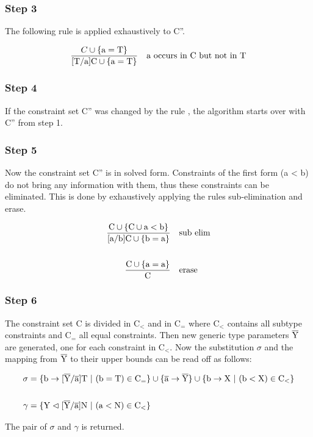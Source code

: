 \subsubsection{Step 3}
The following rule is applied exhaustively to C''.

\begin{align*}
    \frac{C \cup \{ \text{a} = \text{T} \}}{ \text{[T/a]C} \cup \{ \text{a} = \text{T} \} } \quad \text{a occurs in C but not in T}
\end{align*}

\subsubsection{Step 4}
If the constraint set C'' was changed by the rule , the algorithm starts over with C'' from step 1.

\subsubsection{Step 5}
Now the constraint set C'' is in solved form. Constraints of the first form (a < b) do not bring any information with them, thus these constraints can be eliminated.
This is done by exhaustively applying the rules sub-elimination and erase.

\begin{align*}
    \frac{\text{C} \cup \{ \text{C} \cup \text{a} < \text{b} \}}{ \text{[a/b]C} \cup \{ \text{b} = \text{a} \} } \quad &\text{sub elim}
    \\
    \\
    \frac{\text{C} \cup \{ \text{a} = \text{a} \} }{ \text{C} } \quad &\text{erase}
\end{align*}

\subsubsection{Step 6}
The constraint set C is divided in $\text{C}_<$ and in $\text{C}_=$ where $\text{C}_<$ contains all subtype constraints and $\text{C}_=$ all equal constraints.
Then new generic type parameters $\overline{\text{Y}}$ are generated, one for each constraint in $\text{C}_<$. Now the substitution $\sigma$ and the mapping from $\overline{\text{Y}}$ to their upper bounds can be read off as follows:

\begin{align*}
    \sigma &= \{ \text{b} \to \tsxsn{Y}{a}{T} \ | \ (\text{b} = \text{T}) \in \text{C}_= \} \cup \{ \ot{a} \to \ot{Y} \} \cup \{ \text{b} \to \text{X} \ | \ (\text{b} < \text{X}) \in \text{C}_< \}\\
    \\
    \gamma &= \{ \text{Y} \vartriangleleft \tsxsn{Y}{a}{N} \ | \ (\text{a} < \text{N}) \in \text{C}_< \}\\
\end{align*}

The pair of $\sigma$ and $\gamma$ is returned.

